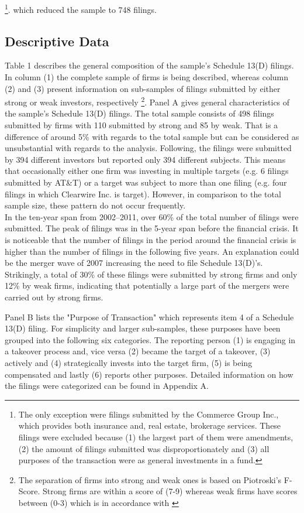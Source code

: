 \documentclass[12pt]{article}
\begin{document}
	\footnote{The only exception were filings submitted by the Commerce Group Inc., which provides both insurance and, real estate, brokerage services. These filings were excluded because (1) the largest part of them were amendments, (2) the amount of filings submitted was disproportionately and (3) all purposes of the transaction were as general investments in a fund.}.
which reduced the sample to 748 filings. 

\subsection{Descriptive Data}

Table 1 describes the general composition of the sample's Schedule 13(D) filings. In column (1) the complete sample of firms is being described, whereas column (2) and (3) present information on sub-samples of filings submitted by either strong or weak investors, respectively
	\footnote{The separation of firms into strong and weak ones is based on Piotroski's F-Score. Strong firms are within a score of (7-9) whereas weak firms have scores between (0-3) which is in accordance with \citet[p.12]{Mohr2012}}.
Panel A gives general characteristics of the sample's Schedule 13(D) filings. The total sample consists of 498 filings submitted by firms with 110 submitted by strong and 85 by weak. That is a difference of around 5\% with regards to the total sample but can be considered as unsubstantial with regards to the analysis. 
Following, the filings were submitted by 394 different investors but reported only 394 different subjects. This means that occasionally either one firm was investing in multiple targets (e.g. 6 filings submitted by AT\&T) or a target was subject to more than one filing (e.g. four filings in which Clearwire Inc. is target). However, in comparison to the total sample size, these pattern do not occur frequently.\\
In the ten-year span from 2002--2011, over 60\% of the total number of filings were submitted. The peak of filings was in the 5-year span before the financial crisis. It is noticeable that the number of filings in the period around the financial crisis is higher than the number of filings in the following five years. An explanation could be the merger wave of 2007 \citep[p.19]{Huang2017} increasing the need to file Schedule 13(D)'s. Strikingly, a total of 30\% of these filings were submitted by strong firms and only 12\% by weak firms, indicating that potentially a large part of the mergers were carried out by strong firms.
	
Panel B lists the "Purpose of Transaction" which represents item 4 of a Schedule 13(D) filing. For simplicity and larger sub-samples, these purposes have been grouped into the following six categories. The reporting person (1) is engaging in a takeover process and, vice versa (2) became the target of a takeover, (3) actively and (4) strategically invests into the target firm, (5) is being compensated and lastly (6) reports other purposes. Detailed information on how the filings were categorized can be found in Appendix A.
\end{document}
